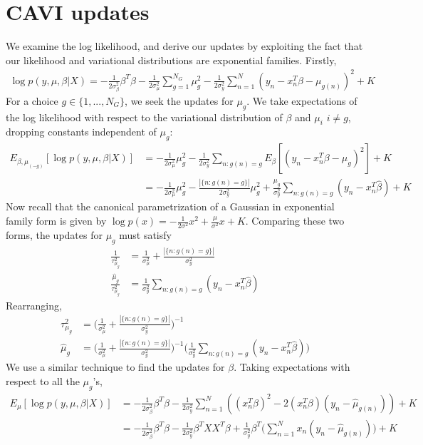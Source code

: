 \documentclass[10pt]{article}
\theoremstyle{plain}
\theoremstyle{definition}
\newcommand{\<}{\langle}
\renewcommand{\>}{\rangle}
\begin{document}
\section{CAVI updates}
We examine the log likelihood, and derive our updates by exploiting the fact that our likelihood and variational distributions are exponential families. Firstly, 
\begin{align*}
\log p(y, \mu, \beta | X) = -\frac{1}{2\sigma^2_\beta}\beta^T\beta - \frac{1}{2\sigma^2_\mu}\sum_{g=1}^{N_G} \mu_g^2 - \frac{1}{2\sigma^2_y}\sum_{n=1}^N (y_n - x_n^T\beta - \mu_{g(n)})^2 + K
\end{align*}
For a choice $g\in\{1, ..., N_G\}$, we seek the updates for $\mu_g$. We take expectations of the log likelihood with respect to the variational distribution of $\beta$ and $\mu_i$ $i\not=g$, dropping constants independent of $\mu_g$: 
\begin{align*}
E_{\beta, \mu_{(-g)}} [ \log p(y, \mu, \beta | X) ] &=  - \frac{1}{2\sigma^2_\mu} \mu_g^2 - \frac{1}{2\sigma^2_y}\sum_{n: g(n) = g} E_{\beta}[(y_n - x_n^T\beta - \mu_{g})^2] + K\\
	&= - \frac{1}{2\sigma^2_\mu} \mu_g^2 - \frac{|\{n : g(n) = g\}|}{2\sigma^2_y} \mu_g^2 + \frac{\mu_g}{\sigma^2_y}\sum_{n: g(n) = g} (y_n - x_n^T\hat\beta) + K
\end{align*}
Now recall that the canonical parametrization of a Gaussian in exponential family form is given by $\log p(x) = -\frac{1}{2\sigma^2} x^2 + \frac{\mu}{\sigma^2}x + K$. Comparing these two forms, the updates for $\mu_g$ must satisfy
\begin{align*}
\frac{1}{\tau^2_{\mu_g}} &= \frac{1}{\sigma^2_\mu} + \frac{|\{n : g(n) = g\}|}{\sigma^2_y}\\
\frac{\hat\mu_g}{\tau^2_{\mu_g}} &= \frac{1}{\sigma^2_y}\sum_{n: g(n) = g} (y_n - x_n^T\hat\beta)
\end{align*}
Rearranging, 
\begin{align*}
{\tau^2_{\mu_g}} &= \Big(\frac{1}{\sigma^2_\mu} + \frac{|\{n : g(n) = g\}|}{\sigma^2_y}\Big)^{-1}\\
{\hat\mu_g} &= \Big(\frac{1}{\sigma^2_\mu} + \frac{|\{n : g(n) = g\}|}{\sigma^2_y}\Big)^{-1}\Big(\frac{1}{\sigma^2_y}\sum_{n: g(n) = g} (y_n - x_n^T\hat\beta)\Big)
\end{align*}
We use a similar technique to find the updates for $\beta$. Taking expectations with respect to all the $\mu_g$'s, 
\begin{align*}
E_\mu[\log p(y, \mu, \beta | X) ] &=  -\frac{1}{2\sigma^2_\beta}\beta^T\beta  - \frac{1}{2\sigma^2_y}\sum_{n=1}^N ((x_n^T\beta)^2 - 2(x_n^T\beta)(y_n - \hat\mu_{g(n)} )) + K\\
	&=  -\frac{1}{2\sigma^2_\beta}\beta^T\beta  - \frac{1}{2\sigma^2_y} \beta^TXX^T\beta + \frac{1}{\sigma^2_y}\beta^T\Big(\sum_{n=1}^N  x_n(y_n - \hat\mu_{g(n)} )\Big) + K
\end{align*}
\end{document}

